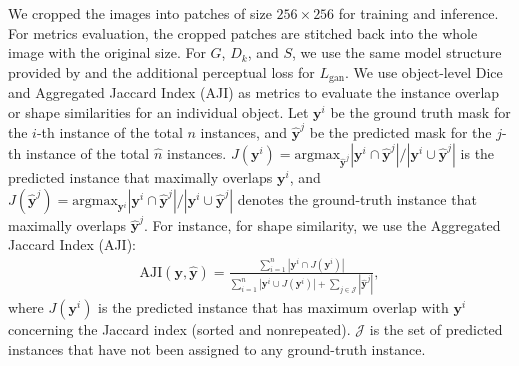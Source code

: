 \documentclass[letterpaper]{article} %
\begin{document}
We cropped the images into patches of size $256 \times 256$ for training and inference. For metrics evaluation, the cropped patches are stitched back into the whole image with the original size. For $G$, $D_k$, and $S$,  we use the same model structure provided by \cite{chang2020synthetic} and the additional perceptual loss \cite{johnson2016perceptual} for $L_\text{gan}$.
We use object-level Dice \cite{chen2016dcan} and Aggregated Jaccard Index (AJI) \cite{vu2019methods} as metrics to evaluate the instance overlap or shape similarities for an individual object. Let $\bm{y}^i$ be the ground truth mask for the $i$-th instance of the total $n$ instances, and $\hat{\bm{y}}^j$ be the predicted mask for the $j$-th instance of the total $\hat{n}$ instances. %
$J(\bm{y}^i)= \text{argmax}_{\hat{\bm{y}}^j} {|\bm{y}^i \cap \hat{\bm{y}}^j|} / {|\bm{y}^i \cup \hat{\bm{y}}^j|}$ is the predicted instance that maximally overlaps $\bm{y}^i$, and $J(\hat{\bm{y}}^j)= \text{argmax}_{\bm{y}^i} {|\bm{y}^i \cap \hat{\bm{y}}^j|} / {|\bm{y}^i \cup \hat{\bm{y}}^j|}$ denotes the ground-truth instance that maximally overlaps $\hat{\bm{y}}^j$.
For instance, for shape similarity, we use the Aggregated Jaccard Index (AJI):
\begin{equation}
\label{eq:aji}
\begin{aligned}
    \text{AJI} (\bm{y}, \hat{\bm{y}})= \frac{\sum_{i=1}^{n} | \bm{y}^i \cap J(\bm{y}^i)| }{ \sum_{i=1}^{n} | \bm{y}^i \cup J(\bm{y}^i)| + \sum_{j \in \mathcal{J}} |\hat{\bm{y}}^j|},
\end{aligned}
\end{equation}
where $J(\bm{y}^i)$ is the predicted instance that has maximum overlap with $\bm{y}^i$ concerning the Jaccard index (sorted and nonrepeated). $\mathcal{J}$ is the set of predicted instances that have not been assigned to any ground-truth instance.
\end{document}
